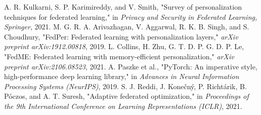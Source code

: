 \documentclass[conference]{IEEEtran}
\begin{document}
\begin{thebibliography}{00}
 A. R. Kulkarni, S. P. Karimireddy, and V. Smith, "Survey of personalization techniques for federated learning," in \textit{Privacy and Security in Federated Learning, Springer}, 2021.
 M. G. R. A. Arivazhagan, V. Aggarwal, R. K. B. Singh, and S. Choudhury, "FedPer: Federated learning with personalization layers," \textit{arXiv preprint arXiv:1912.00818}, 2019.
 L. Collins, H. Zhu, G. T. D. P. G. D. P. Le, "FedME: Federated learning with memory-efficient personalization," \textit{arXiv preprint arXiv:2106.08523}, 2021.
 A. Paszke et al., "PyTorch: An imperative style, high-performance deep learning library," in \textit{Advances in Neural Information Processing Systems (NeurIPS)}, 2019.
 S. J. Reddi, J. Konečný, P. Richtárik, B. Póczos, and A. T. Suresh, "Adaptive federated optimization," in \textit{Proceedings of the 9th International Conference on Learning Representations (ICLR)}, 2021.
\end{thebibliography}
\end{document}

